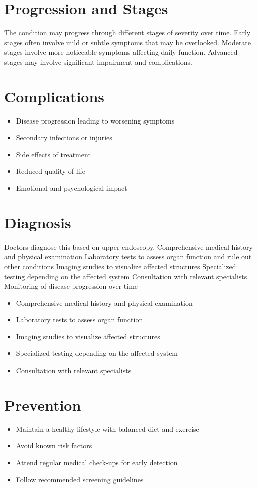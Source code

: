 \section{Progression and Stages}
The condition may progress through different stages of severity over time. Early stages often involve mild or subtle symptoms that may be overlooked. Moderate stages involve more noticeable symptoms affecting daily function. Advanced stages may involve significant impairment and complications.
\section{Complications}
\begin{itemize}[noitemsep]
  \item Disease progression leading to worsening symptoms
  \item Secondary infections or injuries
  \item Side effects of treatment
  \item Reduced quality of life
  \item Emotional and psychological impact
\end{itemize}
\section{Diagnosis}
Doctors diagnose this based on upper endoscopy. Comprehensive medical history and physical examination Laboratory tests to assess organ function and rule out other conditions Imaging studies to visualize affected structures Specialized testing depending on the affected system Consultation with relevant specialists Monitoring of disease progression over time

\begin{itemize}[noitemsep]
  \item Comprehensive medical history and physical examination
  \item Laboratory tests to assess organ function
  \item Imaging studies to visualize affected structures
  \item Specialized testing depending on the affected system
  \item Consultation with relevant specialists
\end{itemize}
\section{Prevention}
\begin{itemize}[noitemsep]
  \item Maintain a healthy lifestyle with balanced diet and exercise
  \item Avoid known risk factors
  \item Attend regular medical check-ups for early detection
  \item Follow recommended screening guidelines
\end{itemize}
